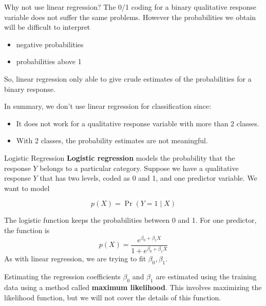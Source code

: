 \documentclass[
  ignorenonframetext,
  aspectratio=169,
]{beamer}
\begin{document}
\begin{frame}{Why not use linear regression?}
\protect\hypertarget{why-not-use-linear-regression-1}{}
The 0/1 coding for a binary qualitative response variable does not
suffer the same problems. However the probabilities we obtain will be
difficult to interpret

\begin{itemize}
\item
  negative probabilities
\item
  probabilities above 1
\end{itemize}

So, linear regression only able to give
\alert{crude estimates of the probabilities for a binary response.}

In summary, we don't use linear regression for classification since:

\begin{itemize}
\item
  It does not work for a qualitative response variable with more than 2
  classes.
\item
  With 2 classes, the probability estimates are not meaningful.
\end{itemize}
\end{frame}

\begin{frame}{Logistic Regression}
\protect\hypertarget{logistic-regression}{}
\textbf{Logistic regression} models the probability that the response
\(Y\) belongs to a particular category. Suppose we have a qualitative
response \(Y\) that has two levels, coded as 0 and 1, and one predictor
variable. We want to model

\[
p(X)=\operatorname{Pr}(Y=1 \mid X)
\]

The logistic function keeps the probabilities between 0 and 1. For one
predictor, the function is \[
p(X)=\frac{e^{\beta_{0}+\beta_{1} X}}{1+e^{\beta_{0}+\beta_{1} X}}
\] As with linear regression, we are trying to fit \(\beta_0, \beta_1\).
\end{frame}

\begin{frame}{Estimating the regression coefficients}
\protect\hypertarget{estimating-the-regression-coefficients}{}
\(\beta_0\) and \(\beta_1\) are estimated using the training data using
a method called \textbf{maximum likelihood}. This involves maximizing
the likelihood function, but we will not cover the details of this
function.
\end{frame}
\end{document}
